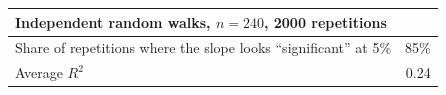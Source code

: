 \begin{tabular}{lr}
\toprule
Independent random walks, $n=240$, 2000 repetitions & \\
\midrule
Share of repetitions where the slope looks ``significant'' at 5\% & 85\% \\
Average $R^2$ & 0.24 \\
\bottomrule
\end{tabular}